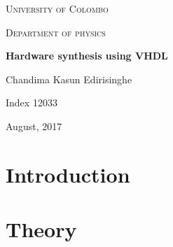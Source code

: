 \documentclass[titlepage]{article}
\numberwithin{figure}{section}
\begin{document}
\begin{titlepage}
	\centering
	\vspace*{\fill}
	{\scshape\LARGE University of Colombo \par}
	\vspace{0.1cm}
	{\scshape\Large Department of physics\par}
	\vspace{1cm}
	{\huge\bfseries Hardware synthesis using VHDL\par}
	\vspace{1cm}
    Chandima Kasun Edirisinghe\par
	Index 12033\par
	August, 2017\par
    \vspace*{\fill}

\end{titlepage}

\begin{abstract}
\thispagestyle{plain}
\setcounter{page}{1}
The purpose of this report is to synthesize digital circuits on complex programmable logic devices (CPLD). In this process, very high speed integrated circuit (VHSIC) hardware description language called VHDL was used. The first part of this practical is based on synthesizing combinational and sequential logics using VHDL. For this process, a Basys2 Spartan-3E FGPA board was used. In synthesizing logics, an AND gate, a BCD to SSD decoder and a mod 10 counter are synthesized. The second part of the practical is based on direct digital synthesis (DDS) using the Basys2 FPGA board combined with a R-2R ladder. In this process, a saw tooth signal, a triangular signal, a rectangular signal with adjustable duty cycle and a sinusoidal signal are synthesized.
 
\end{abstract}

\tableofcontents
\setcounter{page}{2}
\pagebreak
\listoffigures
\pagebreak


\section{Introduction}

\pagebreak
\section{Theory}

\pagebreak
\end{document}
